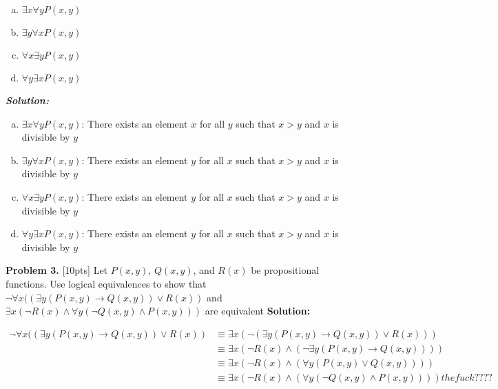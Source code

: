 \documentclass[10pt]{article}
\renewcommand{\implies}{\rightarrow}
\renewcommand{\lor}{\vee}
\renewcommand{\land}{\wedge}
\begin{document}
    \begin{enumerate}[a.]
      \item $\exists x \forall yP(x,y)$
      \item $\exists y \forall xP(x,y)$
      \item $\forall x \exists yP(x,y)$
      \item $\forall y \exists xP(x,y)$
    \end{enumerate}
\textit{\textbf{Solution:}}
    \begin{enumerate}[a.]
      \item $\exists x \forall yP(x,y)$: There exists an element $x$ for all $y$ such that $x>y$ and $x$ is divisible by $y$
      \item $\exists y \forall xP(x,y)$: There exists an element $y$ for all $x$ such that $x>y$ and $x$ is divisible by $y$
      \item $\forall x \exists yP(x,y)$: There exists an element $y$ for all $x$ such that $x>y$ and $x$ is divisible by $y$
      \item $\forall y \exists xP(x,y)$: There exists an element $y$ for all $x$ such that $x>y$ and $x$ is divisible by $y$
    \end{enumerate}
\clearpage
\textbf{Problem 3.} [10pts] Let $P(x,y)$, $Q(x,y)$, and $R(x)$ be propositional functions. Use logical equivalences to show that $\lnot \forall x((\exists y(P(x,y) \implies Q(x,y)) \lor R(x))$ and $\exists x(\lnot R(x) \land \forall y(\lnot Q(x,y) \land P(x,y)))$ are equivalent
\textbf{Solution:}
\begin{center}
  \begin{align*}
    \lnot \forall x((\exists y(P(x,y) \implies Q(x,y)) \lor R(x)) &\equiv \exists x(\lnot(\exists y(P(x,y) \implies Q(x,y)) \lor R(x)))\\
    &\equiv \exists x (\lnot R(x) \land (\lnot \exists y (P(x,y) \implies Q(x,y))))\\
    &\equiv \exists x (\lnot R(x) \land (\forall y (P(x,y) \lor
    Q(x,y))))\\
    &\equiv \exists x (\lnot R(x) \land (\forall y (\lnot Q(x,y) \land P(x,y))))
    the fuck ????
  \end{align*}
\end{center}
\end{document}
